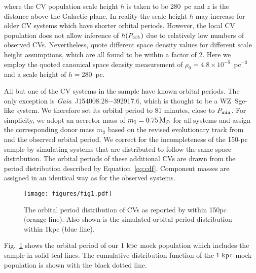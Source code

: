 \documentclass[fleqn,usenatbib]{mnras}
\newcommand{\gaia}{{\it Gaia}}
\begin{document}
\noindent where the CV population scale height $h$ is taken to be 280~pc and $z$ is the distance above the Galactic plane. In reality the scale height $h$ may increase for older CV systems which have shorter orbital periods. However, the local CV population does not allow inference of $h(P_{\rm{orb}})$ due to relatively low numbers of observed CVs. Nevertheless, \cite{pala20} quote different space density values for different scale height assumptions, which are all found to be within a factor of $2$. Here we employ the quoted canonical space density measurement of $\rho_0=4.8 \times 10^{-6}$~pc$^{-3}$ and a scale height of $h=280$~pc.


All but one of the CV systems in the \cite{pala20} sample have known orbital periods. The only exception is \gaia\ J154008.28$-$392917.6, which is thought to be a  WZ~Sge-like system. We therefore set its orbital period to 81 minutes, close to $P_{\rm{min}}$. For simplicity, we adopt an accretor mass of $m_1 = 0.75\, \rm{M_{\odot}}$ for all systems and assign the corresponding donor mass $m_2$ based on the revised evolutionary track from \citet{knigge11} and the observed orbital period. We correct for the incompleteness of the \citet{pala20} 150-pc sample by simulating systems that are distributed to follow the same space distribution. 
The orbital periods of these additional CVs are drawn from the period distribution described by Equation~\ref{eq:cdf}. Component masses are assigned in an identical way as for the observed systems. 

\begin{figure}
	\texttt{[image: figures/fig1.pdf]}
    \caption{The orbital period distribution of CVs as reported by \citet{pala20} within 150pc (orange line). Also shown is the simulated orbital period distribution within 1kpc (blue line).}
    \label{fig:porb}
\end{figure}

Fig.~\ref{fig:porb} shows the 
orbital period of our $1~\rm{kpc}$ mock population which includes the \citet{pala20} sample in solid teal lines. The cumulative distribution function of the 
$1~\rm{kpc}$ mock population is shown with the black dotted line. 
\end{document}
